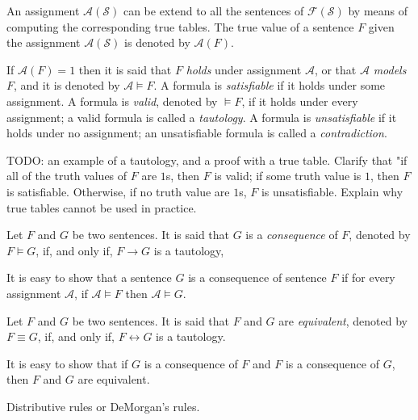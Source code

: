 An assignment $\mathcal{A}(\mathcal{S})$ can be extend to all the sentences of $\mathcal{F}(\mathcal{S})$ by means of computing the corresponding true tables. The true value of a sentence $F$ given the assignment $\mathcal{A}(\mathcal{S})$ is denoted by $\mathcal{A}(F)$.

\begin{definition}
If $\mathcal{A}(F)=1$ then it is said that $F$ \emph{holds} under assignment $\mathcal{A}$, or that $\mathcal{A}$ \emph{models} $F$, and it is denoted by $\mathcal{A} \models F$. A formula is \emph{satisfiable} if it holds under some assignment. A formula is \emph{valid}, denoted by $\models F$, if it holds under every assignment; a valid formula is called a \emph{tautology}. A formula is \emph{unsatisfiable} if it holds under no assignment; an unsatisfiable formula is called a \emph{contradiction}.
\end{definition}

\begin{example}
{\color{red} TODO: an example of a tautology, and a proof with a true table. Clarify that "if all of the truth values of $F$ are $1$s, then $F$ is valid; if some truth value is $1$, then $F$ is satisfiable. Otherwise, if no truth value are $1$s, $F$ is unsatisfiable. Explain why true tables cannot be used in practice.}
\end{example}

\begin{definition}
Let $F$ and $G$ be two sentences. It is said that $G$ is a \emph{consequence} of $F$, denoted by $F \models G$, if, and only if, $F \rightarrow G$ is a tautology, 
\end{definition}

It is easy to show that a sentence $G$ is a consequence of sentence $F$ if for every assignment $\mathcal{A}$, if $\mathcal{A} \models F$ then $\mathcal{A} \models G$.

\begin{definition}
Let $F$ and $G$ be two sentences. It is said that $F$ and $G$ are \emph{equivalent}, denoted by $F \equiv G$, if, and only if, $F \leftrightarrow G$ is a tautology.
\end{definition}

It is easy to show that if $G$ is a consequence of $F$ and $F$ is a consequence of $G$, then $F$ and $G$ are equivalent.

\begin{example}
{\color{red} Distributive rules or DeMorgan's rules.}
\end{example}

